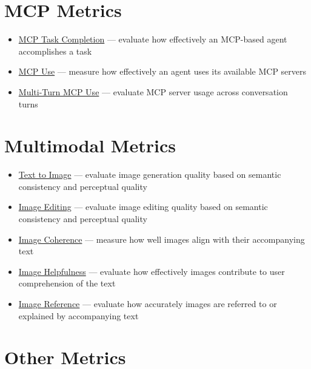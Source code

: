 \documentclass[
  letterpaper,
  DIV=11,
  numbers=noendperiod,
  oneside]{scrreprt}
\begin{document}
\begin{tcolorbox}
\section{MCP Metrics}\label{mcp-metrics}

\begin{itemize}
\item
  \href{https://deepeval.com/docs/metrics-mcp-task-completion}{MCP Task
  Completion} --- evaluate how effectively an MCP-based agent
  accomplishes a task
\item
  \href{https://deepeval.com/docs/metrics-mcp-use}{MCP Use} --- measure
  how effectively an agent uses its available MCP servers
\item
  \href{https://deepeval.com/docs/metrics-multi-turn-mcp-use}{Multi-Turn
  MCP Use} --- evaluate MCP server usage across conversation turns
\end{itemize}

\section{Multimodal Metrics}\label{multimodal-metrics}

\begin{itemize}
\item
  \href{https://deepeval.com/docs/multimodal-metrics-text-to-image}{Text
  to Image} --- evaluate image generation quality based on semantic
  consistency and perceptual quality
\item
  \href{https://deepeval.com/docs/multimodal-metrics-image-editing}{Image
  Editing} --- evaluate image editing quality based on semantic
  consistency and perceptual quality
\item
  \href{https://deepeval.com/docs/multimodal-metrics-image-coherence}{Image
  Coherence} --- measure how well images align with their accompanying
  text
\item
  \href{https://deepeval.com/docs/multimodal-metrics-image-helpfulness}{Image
  Helpfulness} --- evaluate how effectively images contribute to user
  comprehension of the text
\item
  \href{https://deepeval.com/docs/multimodal-metrics-image-reference}{Image
  Reference} --- evaluate how accurately images are referred to or
  explained by accompanying text
\end{itemize}

\section{Other Metrics}\label{other-metrics}


\end{tcolorbox}
\end{document}

